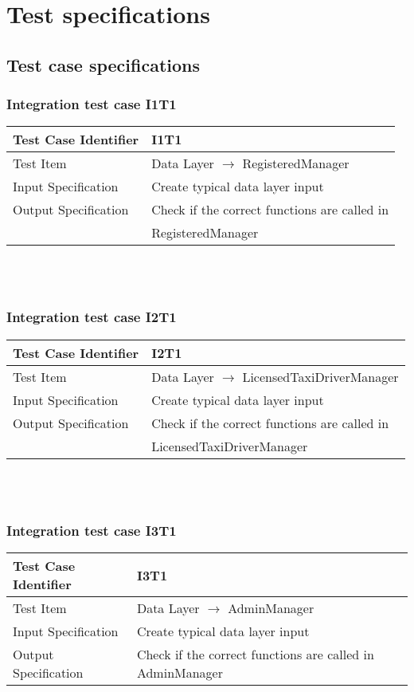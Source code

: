 \documentclass[12pt, oneside]{book}   	%
\begin{document}
\chapter{Test specifications}
\section{Test case specifications}
\subsection{Integration test case I1T1}
\begin{tabular}{|l|l|}
\hline
Test Case Identifier & I1T1\\
\hline
Test Item & Data Layer $\rightarrow$ RegisteredManager\\
\hline
Input Specification & Create typical data layer input\\
\hline
Output Specification & Check if the correct functions are called in\\
& RegisteredManager\\
\hline
\end{tabular}
\\
\\
\subsection{Integration test case I2T1}
\begin{tabular}{|l|l|}
\hline
Test Case Identifier & I2T1\\
\hline
Test Item & Data Layer $\rightarrow$ LicensedTaxiDriverManager\\
\hline
Input Specification & Create typical data layer input\\
\hline
Output Specification & Check if the correct functions are called in\\
& LicensedTaxiDriverManager\\
\hline
\end{tabular}
\\
\\
\subsection{Integration test case I3T1}
\begin{tabular}{|l|l|}
\hline
Test Case Identifier & I3T1\\
\hline
Test Item & Data Layer $\rightarrow$ AdminManager\\
\hline
Input Specification & Create typical data layer input\\
\hline
Output Specification & Check if the correct functions are called in AdminManager\\
\hline
\end{tabular}
\\
\\
\end{document}
